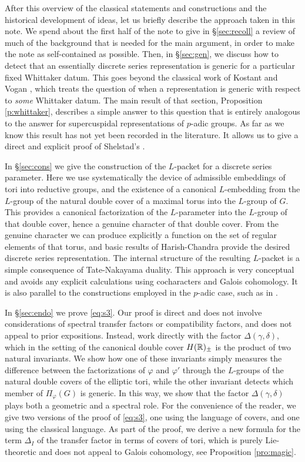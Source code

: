 \documentclass{article}
\theoremstyle{definition}
\numberwithin{equation}{section}
\renewcommand{\-}{\hyp{}}
\begin{document}
After this overview of the classical statements and constructions and the historical development of ideas, let us briefly describe the approach taken in this note. We spend about the first half of the note to give in \S\ref{sec:recoll} a review of much of the background that is needed for the main argument, in order to make the note as self-contained as possible. Then, in \S\ref{sec:gen}, we discuss how to detect that an essentially discrete series representation is generic for a particular fixed Whittaker datum. This goes beyond the classical work of Kostant \cite{Kos78} and Vogan \cite{Vog78}, which treats the question of when a representation is generic with respect to \emph{some} Whittaker datum. The main result of that section, Proposition \ref{p:whittaker}, describes a simple answer to this question that is entirely analogous to the answer for supercuspidal representations of $p$-adic groups. As far as we know this result has not yet been recorded in the literature. It allows us to give a direct and explicit proof of Shelstad's \cite[Theorem 11.5]{SheTE3}.

In \S\ref{sec:cons} we give the construction of the $L$\-packet for a discrete series parameter. Here we use systematically the device of admissible embeddings of tori into reductive groups, and the existence of a canonical $L$\-embedding from the $L$\-group of the natural double cover of a maximal torus into the $L$\-group of $G$. This provides a canonical factorization of the $L$\-parameter into the $L$\-group of that double cover, hence a genuine character of that double cover. From the genuine character we can produce explicitly a function on the set of regular elements of that torus, and basic results of Harish-Chandra provide the desired discrete series representation. The internal structure of the resulting $L$\-packet is a simple consequence of Tate-Nakayama duality. This approach is very conceptual and avoids any explicit calculations using cocharacters and Galois cohomology. It is also parallel to the constructions employed in the $p$-adic case, such as in \cite{KalRSP}.

In \S\ref{sec:endo} we prove \eqref{eq:s3}. Our proof is direct and does not involve considerations of spectral transfer factors or compatibility factors, and does not appeal to prior expositions. Instead, work directly with the factor $\Delta(\gamma,\delta)$, which in the setting of the canonical double cover $H(\mathbb{R})_\pm$ is the product of two natural invariants. We show how one of these invariants simply measures the difference between the factorizations of $\varphi$ and $\varphi'$ through the $L$\-groups of the natural double covers of the elliptic tori, while the other invariant detects which member of $\Pi_\varphi(G)$ is generic. In this way, we show that the factor $\Delta(\gamma,\delta)$ plays both a geometric and a spectral role. For the convenience of the reader, we give two versions of the proof of \eqref{eq:s3}, one using the language of covers, and one using the classical language. As part of the proof, we derive a new formula for the term $\Delta_I$ of the transfer factor in terms of covers of tori, which is purely Lie-theoretic and does not appeal to Galois cohomology, see Proposition \ref{pro:magic}.
\end{document}
